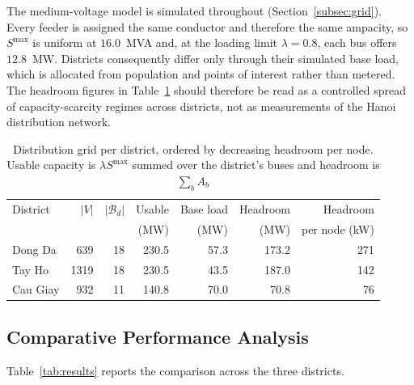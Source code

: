 \documentclass[graybox]{svmult}
\begin{document}
\label{subsec:gridstats}
The medium-voltage model is simulated throughout (Section~\ref{subsec:grid}). Every feeder is assigned the same conductor and therefore the same ampacity, so $S^{\max}$ is uniform at $16.0$~MVA and, at the loading limit $\lambda=0.8$, each bus offers $12.8$~MW. Districts consequently differ only through their simulated base load, which is allocated from population and points of interest rather than metered. The headroom figures in Table~\ref{tab:grid} should therefore be read as a controlled spread of capacity-scarcity regimes across districts, not as measurements of the Hanoi distribution network.



\begin{table}[!t]
\caption{Distribution grid per district, ordered by decreasing headroom per node. Usable capacity is $\lambda S^{\max}$ summed over the district's buses and headroom is $\sum_b A_b$}
\label{tab:grid}
\centering
\footnotesize
\setlength{\tabcolsep}{7pt}
\begin{tabular}{@{}lrr rrrr@{}}
\toprule
District & $|V|$ & $|\mathcal{B}_d|$ & Usable & Base load & Headroom & Headroom \\
         &       &                   & (MW)   & (MW)      & (MW)     & per node (kW) \\
\midrule
Dong Da  &  639 & 18 & 230.5 & 57.3 & 173.2 & 271 \\
Tay Ho   & 1319 & 18 & 230.5 & 43.5 & 187.0 & 142 \\
Cau Giay &  932 & 11 & 140.8 & 70.0 & \phantom{0}70.8 & \phantom{0}76 \\
\bottomrule
\end{tabular}
\end{table}

\subsection{Comparative Performance Analysis}
\label{subsec:comparative}

Table~\ref{tab:results} reports the comparison across the three districts.
\end{document}
